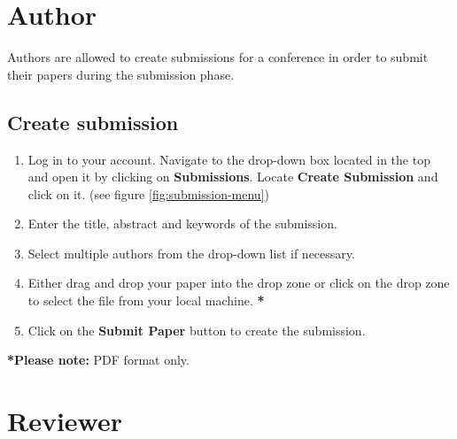 \documentclass[nochapterpage,nopartpage,noheadingspace,numbersubsubsec,bigchapter,colorback,accentcolor=tud9c,10pt]{tudreport}
\begin{document}
  \chapter{Author}

Authors are allowed to create submissions for a conference in order to submit their papers during the submission phase.

	\section{Create submission}


\begin{enumerate}
	\item	Log in to your account. Navigate to the drop-down box located in the top and open it by clicking on \textbf{Submissions}. Locate \textbf{Create Submission} and click on it. (see figure \ref{fig:submission-menu})
	\item	Enter the title, abstract and keywords of the submission.
	\item	Select multiple authors from the drop-down list if necessary.
	\item	Either drag and drop your paper into the drop zone or click on the drop zone to select the file from your local machine. \textbf{*}
	\item	Click on the \textbf{Submit Paper} button to create the submission.
\end{enumerate}


\textbf{*Please note:} PDF format only.


  \chapter{Reviewer}
\end{document}
